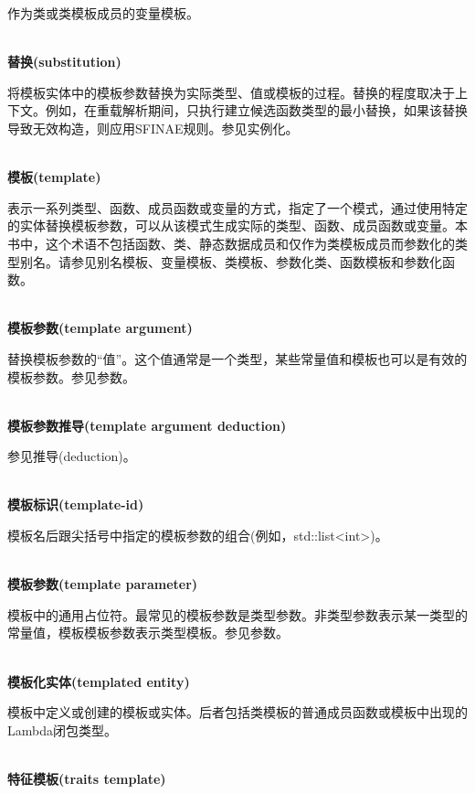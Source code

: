 作为类或类模板成员的变量模板。

\hspace*{\fill} \\ %
\noindent
\textbf{替换(substitution)}

将模板实体中的模板参数替换为实际类型、值或模板的过程。替换的程度取决于上下文。例如，在重载解析期间，只执行建立候选函数类型的最小替换，如果该替换导致无效构造，则应用SFINAE规则。参见实例化。

\hspace*{\fill} \\ %
\noindent
\textbf{模板(template)}

表示一系列类型、函数、成员函数或变量的方式，指定了一个模式，通过使用特定的实体替换模板参数，可以从该模式生成实际的类型、函数、成员函数或变量。本书中，这个术语不包括函数、类、静态数据成员和仅作为类模板成员而参数化的类型别名。请参见别名模板、变量模板、类模板、参数化类、函数模板和参数化函数。

\hspace*{\fill} \\ %
\noindent
\textbf{模板参数(template argument)}

替换模板参数的“值”。这个值通常是一个类型，某些常量值和模板也可以是有效的模板参数。参见参数。

\hspace*{\fill} \\ %
\noindent
\textbf{模板参数推导(template argument deduction)}

参见推导(deduction)。

\hspace*{\fill} \\ %
\noindent
\textbf{模板标识(template-id)}

模板名后跟尖括号中指定的模板参数的组合(例如，std::list<int>)。

\hspace*{\fill} \\ %
\noindent
\textbf{模板参数(template parameter)}

模板中的通用占位符。最常见的模板参数是类型参数。非类型参数表示某一类型的常量值，模板模板参数表示类型模板。参见参数。

\hspace*{\fill} \\ %
\noindent
\textbf{模板化实体(templated entity)}

模板中定义或创建的模板或实体。后者包括类模板的普通成员函数或模板中出现的Lambda闭包类型。

\hspace*{\fill} \\ %
\noindent
\textbf{特征模板(traits template)}

